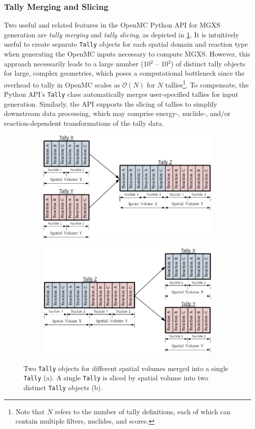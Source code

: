\subsubsection{Tally Merging and Slicing}
\label{subsubsec:tally-slice-merge}

Two useful and related features in the OpenMC Python API for MGXS generation are \emph{tally merging} and \emph{tally slicing}, as depicted in \cref{fig:tally-merge-slice}. It is intuitively useful to create separate \texttt{Tally} objects for each spatial domain and reaction type when generating the OpenMC inputs necessary to compute MGXS. However, this approach necessarily leads to a large number (10$^2$ -- 10$^3$) of distinct tally objects for large, complex geometries, which poses a computational bottleneck since the overhead to tally in OpenMC scales as $\mathcal{O}(N)$ for $N$ tallies\footnote{Note that $N$ refers to the number of tally definitions, each of which can contain multiple filters, nuclides, and scores.}. To compensate, the Python API's \texttt{Tally} class automatically merges user-specified tallies for input generation. Similarly, the API supports the slicing of tallies to simplify downstream data processing, which may comprise energy-, nuclide-, and/or reaction-dependent transformations of the tally data.

\begin{figure}
\begin{subfigure}{\textwidth}
  \centering
  \includegraphics[width=0.6\linewidth]{figures/tally-merge}
  \caption{}
\end{subfigure}
\begin{subfigure}{\textwidth}
  \centering
  \includegraphics[width=0.6\linewidth]{figures/tally-slice}
  \caption{}
\end{subfigure}
\caption{Two \texttt{Tally} objects for different spatial volumes merged into a single \texttt{Tally} (a). A single \texttt{Tally} is sliced by spatial volume into two distinct \texttt{Tally} objects (b).}
\label{fig:tally-merge-slice}
\end{figure}

